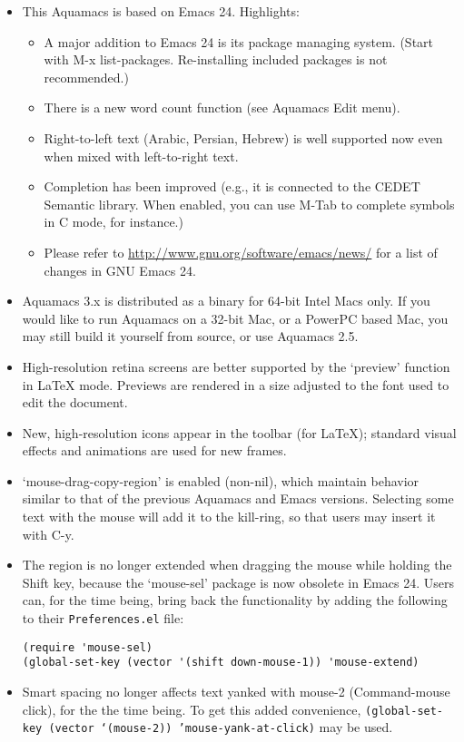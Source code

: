 \begin{itemize}
\item This Aquamacs is based on Emacs 24. Highlights:
\begin{itemize}
\item A major addition to Emacs 24 is its package managing system.  (Start with M-x list-packages.  Re-installing included packages is not recommended.)
\item There is a new word count function (see Aquamacs Edit menu).
\item Right-to-left text (Arabic, Persian, Hebrew) is well supported now even when mixed with left-to-right text.
\item Completion has been improved (e.g., it is connected to the CEDET Semantic library.  When enabled, you can use M-Tab to complete symbols in C mode, for instance.)
\item Please refer to \url{http://www.gnu.org/software/emacs/news/} for a list of changes in GNU Emacs 24.
\end{itemize}
\item Aquamacs 3.x is distributed as a binary for 64-bit Intel Macs only.  If you would like to run Aquamacs on a 32-bit Mac, or a PowerPC based Mac, you may still build it yourself from source, or use Aquamacs 2.5.
\item High-resolution retina screens are better supported by the `preview' function in LaTeX mode.  Previews are rendered in a size adjusted to the font used to edit the document.
\item New, high-resolution icons appear in the toolbar (for LaTeX); standard visual effects and animations are used for new frames.
\item `mouse-drag-copy-region' is enabled (non-nil), which maintain behavior similar to that of the previous Aquamacs and Emacs versions.  Selecting some text with the mouse will add it to the kill-ring, so that users may insert it with C-y.
\item The region is no longer extended when dragging the mouse while holding the Shift key, because the `mouse-sel' package is now obsolete in Emacs 24.  Users can, for the time being, bring back the functionality by adding the following to their {\tt Preferences.el} file:
\begin{verbatim}
(require 'mouse-sel)
(global-set-key (vector '(shift down-mouse-1)) 'mouse-extend)
\end{verbatim}
\item Smart spacing no longer affects text yanked with mouse-2 (Command-mouse click), for the the time being.  To get this added convenience, {\tt (global-set-key (vector `(mouse-2)) 'mouse-yank-at-click)} may be used.

\end{itemize}
